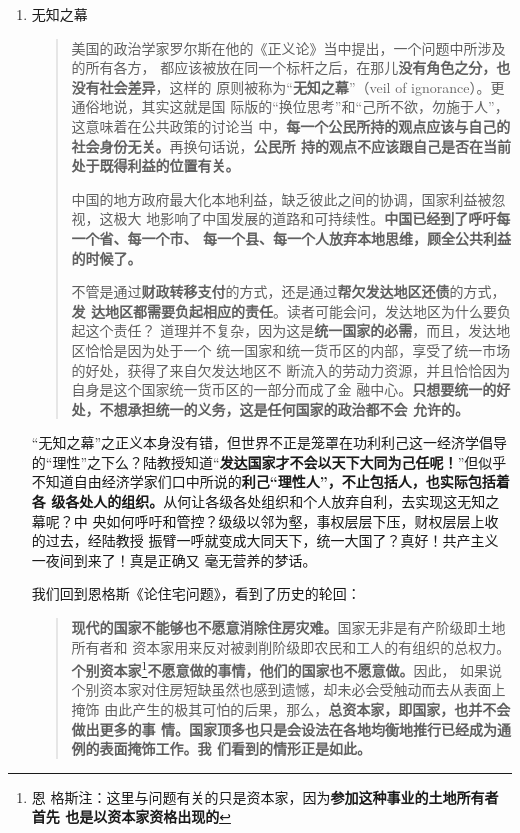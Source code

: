 \begin{enumerate}

\item 无知之幕

  \begin{quotation}
    美国的政治学家罗尔斯在他的《正义论》当中提出，一个问题中所涉及的所有各方，
    都应该被放在同一个标杆之后，在那儿\textbf{没有角色之分，也没有社会差异}，这样的
    原则被称为“\textbf{无知之幕}”（veil of ignorance）。更通俗地说，其实这就是国
    际版的“换位思考”和“己所不欲，勿施于人”，这意味着在公共政策的讨论当
    中，\textbf{每一个公民所持的观点应该与自己的社会身份无关。}再换句话说，\textbf{公民所
      持的观点不应该跟自己是否在当前处于既得利益的位置有关。}


    中国的地方政府最大化本地利益，缺乏彼此之间的协调，国家利益被忽视，这极大
    地影响了中国发展的道路和可持续性。\textbf{中国已经到了呼吁每一个省、每一个市、
      每一个县、每一个人放弃本地思维，顾全公共利益的时候了。}


    不管是通过\textbf{财政转移支付}的方式，还是通过\textbf{帮欠发达地区还债}的方式，\textbf{发
      达地区都需要负起相应的责任}。读者可能会问，发达地区为什么要负起这个责任？
    道理并不复杂，因为这是\textbf{统一国家的必需}，而且，发达地区恰恰是因为处于一个
    统一国家和统一货币区的内部，享受了统一市场的好处，获得了来自欠发达地区不
    断流入的劳动力资源，并且恰恰因为自身是这个国家统一货币区的一部分而成了金
    融中心。\textbf{只想要统一的好处，不想承担统一的义务，这是任何国家的政治都不会
      允许的。}
  \end{quotation}

  “无知之幕”之正义本身没有错，但世界不正是笼罩在功利利己这一经济学倡导
  的“理性”之下么？陆教授知道“\textbf{发达国家才不会以天下大同为己任呢！}”但似乎
  不知道自由经济学家们口中所说的\textbf{利己“理性人”，不止包括人，也实际包括着各
    级各处人的组织。}从何让各级各处组织和个人放弃自利，去实现这无知之幕呢？中
  央如何呼吁和管控？级级以邻为壑，事权层层下压，财权层层上收的过去，经陆教授
  振臂一呼就变成大同天下，统一大国了？真好！共产主义一夜间到来了！真是正确又
  毫无营养的梦话。


  我们回到恩格斯《论住宅问题》，看到了历史的轮回：
  \begin{quotation}
    \textbf{现代的国家不能够也不愿意消除住房灾难。}国家无非是有产阶级即土地所有者和
    资本家用来反对被剥削阶级即农民和工人的有组织的总权力。\textbf{个别资本家}\footnote{恩
      格斯注：这里与问题有关的只是资本家，因为\textbf{参加这种事业的土地所有者首先
        也是以资本家资格出现的}}\textbf{不愿意做的事情，他们的国家也不愿意做。}因此，
    如果说个别资本家对住房短缺虽然也感到遗憾，却未必会受触动而去从表面上掩饰
    由此产生的极其可怕的后果，那么，\textbf{总资本家，即国家，也并不会做出更多的事
      情。国家顶多也只是会设法在各地均衡地推行已经成为通例的表面掩饰工作。我
      们看到的情形正是如此。}
  \end{quotation}



\end{enumerate}
